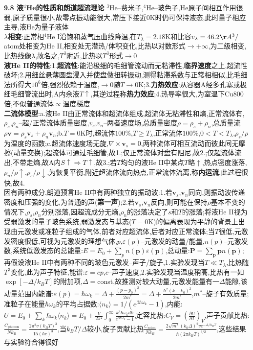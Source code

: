 \documentclass[10pt,a4paper]{article}
\begin{document}
\begin{multicols}{2}
\textbf{9.8 液$^4$He的性质和朗道超流理论}
$^3$He--费米子,$^4$He--玻色子,He原子间相互作用很弱,原子质量很小,故零点振动能很大,常压下接近$0$K时仍可保持液态,此时量子相应主导,液He为量子液体\\
\textbf{$\lambda$相变}:正常相$^4$He I沿饱和蒸气压曲线降温,在$T_{\lambda}=2.18$K和比容$v_{\lambda}=46.2\AA^3/$atom处相变为He II,相变处无潜热/体积变化,比热以对数形式$\rightarrow+\infty$,为二级相变,比热线像$\lambda$,故名之,$T^3$附近,比热以$T^3$形式$\rightarrow0$\\
\textbf{液He II的特性}:1.\textbf{超流性}:能沿极细的毛细管流动而无粘滞性,\textbf{临界速度}之上,超流性破坏;2.用细丝悬薄圆盘浸入并使盘做扭转振动,测得粘滞系数与正常相相似,比毛细法所得大$10^6$倍,强烈依赖于温度,$\rightarrow0$随$T\rightarrow0$K;3.\textbf{力热效应}:从容器A经多孔塞或极细毛细管流出时,A内余液$T\uparrow$,其逆过程称\textbf{热力效应};4.热导率很大,为室温下Cu800倍,不似普通流体$\propto$温度梯度\\
\textbf{二流体模型}:a.液He II由正常流体和超流体组成,超流体无粘滞性和熵,正常流体有,$\rho_s$,$\rho_n$--超/正常流体质量密度,$v_s$,$v_n$--两者速度场,总质量密度$\rho=\rho_s+\rho_n$,总质量流$\rho\bm{v}=\rho_s\bm{v}_s+\rho_n\bm{v}_n$;b.$T=0$K时,超流体$100\%$,$T\geq T_{\lambda}$,正常流体$100\%$,$0<T<T_{\lambda}$,$\rho_s/\rho$为温度的函数;c.超流体速度场无旋,$\nabla\times\bm{v}_s=0$,两种流体可相互流动而彼此间无摩擦(动量交换);超流体可通过毛细管,故1.;仅正常流体对盘有阻尼,故2.;仅超流体流出,不带走熵,故A内$S\uparrow\Rightarrow T\uparrow$,故3.;若$T$均匀的液He II中某点$T$略$\uparrow$,热点密度涨落,$\rho_n/\rho\uparrow$,$\rho_s/\rho\downarrow$,为恢复平衡,附近超流体流向热点,正常流体流离,称\textbf{内运流},此过程很快,故4.\\
因有两种成分,朗道预言He II中有两种独立的振动波:1.若$\bm{v}_s$,$\bm{v}_n$同向,则振动波传递密度和压强的变化,为普通的声(\textbf{第一声});2.若$\bm{v}_s$,$\bm{v}_n$反向,则可能在保持$\rho$基本不变的情况下,$\rho_s$,$\rho_n$分别涨落,因超流成分无熵,$\rho_n$的涨落决定了$s$和$T$的涨落;将液He II视为受弱激发的量子玻色系统,弱激发态与基态($T=0$K)的偏离表现为平静的背景上出现由元激发或准粒子组成的气体,前者对应超流体,后者对应正常流体;当$T$很低,元激发密度很低,可视为元激发的理想气体,$p$,$\varepsilon(p)$--元激发的动量/能量,$n(p)$--元激发数,系统低激发态的总能量:$E=E_0+\sum_pn(\bm{p})\varepsilon(\bm{p})$,总动量:$\bm{P}=\sum_{\bm{p}}\bm{p}n(\bm{p})$;再假设液He II中有两种不同的玻色元激发--声子/旋子,1.实验发现当$T\ll T_{\lambda}$,比热随$T^3$变化,此为声子特征,能谱:$\varepsilon=cp$,$c$--声子速度,2.实验发现当温度稍高,比热有一如$\exp[-\Delta/k_BT]$的附加项,$\Delta=$const,故推测对较大动量,元激发能量有一$\Delta$能隙,该动量范围内能谱:$\varepsilon(p)=\hbar\omega_k=\Delta+\frac{(p-p_0)^2}{2m^*}=\Delta+\frac{\hbar^2(k-k_0)^2}{2m^*}$,$m^*$--旋子有效质量;准粒子在能量$\hbar\omega_k$的平均占据数:$\langle n_k\rangle=1/(e^{\beta\hbar\omega_k}-1)$,内能:$U=E_0+\sum_k\hbar\omega_k\langle n_k\rangle=E_0+\frac{V}{2\pi^2}\int_0^{\infty}\frac{k^2\hbar\omega_kdk}{e^{\beta\hbar\omega_k}-1}$,定容比热:$C_V=\left(\frac{\partial U}{\partial T}\right)_V$,声子贡献比热:$\frac{C_{\text{phonon}}}{Nk_B}=\frac{2\pi^2v(k_BT)^3}{15(\hbar c)^3}$,当$k_BT/\Delta$较小,旋子贡献比热$\frac{C_{\text{roton}}}{Nk_B}=\frac{2\sqrt{m^*}(k_0\Delta)^2ve^{-\Delta/k_BT}}{\hbar(2\pi k_BT)^{3/2}}$,这些结果与实验符合得很好\\

\end{multicols}
\end{document}
